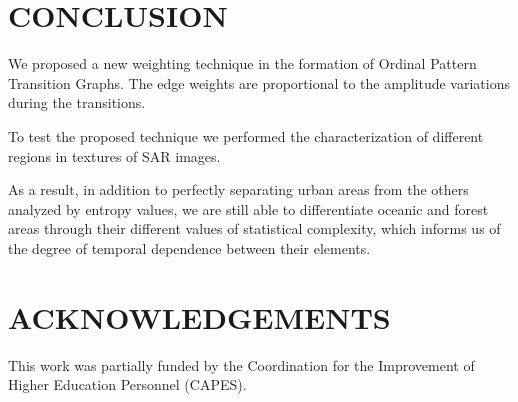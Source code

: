 \documentclass{isprs}
\begin{document}


\section{CONCLUSION}\label{Conclusion}

We proposed a new weighting technique in the formation of Ordinal Pattern Transition Graphs.
The edge weights are proportional to the amplitude variations during the transitions.

To test the proposed technique we performed the characterization of different regions in textures of SAR images.

As a result, in addition to perfectly separating urban areas from the others analyzed by entropy values, we are still able to differentiate oceanic and forest areas through their different values of statistical complexity, which informs us of the degree of temporal dependence between their elements.




\section*{ACKNOWLEDGEMENTS}\label{ACKNOWLEDGEMENTS}

This work was partially funded by the Coordination for the Improvement of Higher Education Personnel (CAPES).
\end{document}
